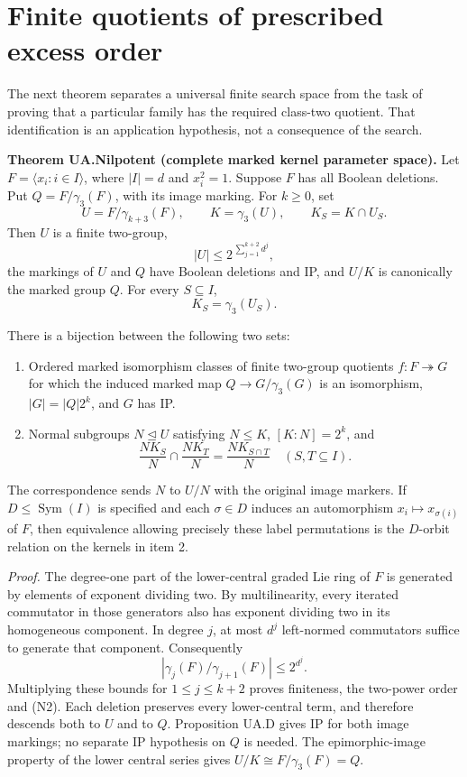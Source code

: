 \section{Finite quotients of prescribed excess order}\label{finite-quotients-of-prescribed-excess-order}

The next theorem separates a universal finite search space from the task
of proving that a particular family has the required class-two quotient.
That identification is an application hypothesis, not a consequence of
the search.

\textbf{Theorem UA.Nilpotent (complete marked kernel parameter space).}
Let \(F=\langle x_i:i\in I\rangle\), where \(|I|=d\) and \(x_i^2=1\).
Suppose \(F\) has all Boolean deletions. Put \(Q=F/\gamma_3(F)\), with
its image marking. For \(k\geq0\), set \[
U=F/\gamma_{k+3}(F),\qquad K=\gamma_3(U),\qquad
K_S=K\cap U_S.
\tag{N1}
\] Then \(U\) is a finite two-group, \[
|U|\leq 2^{\,\sum_{j=1}^{k+2}d^j},
\tag{N2}
\] the markings of \(U\) and \(Q\) have Boolean deletions and IP, and
\(U/K\) is canonically the marked group \(Q\). For every
\(S\subseteq I\), \[
K_S=\gamma_3(U_S).
\tag{N3}
\]

There is a bijection between the following two sets:

\begin{enumerate}
\def\labelenumi{\arabic{enumi}.}
\tightlist
\item
  Ordered marked isomorphism classes of finite two-group quotients
  \(f:F\twoheadrightarrow G\) for which the induced marked map
  \(Q\to G/\gamma_3(G)\) is an isomorphism, \(|G|=|Q|2^k\), and \(G\)
  has IP.
\item
  Normal subgroups \(N\unlhd U\) satisfying \(N\leq K\), \([K:N]=2^k\),
  and \[
  \frac{NK_S}{N}\cap\frac{NK_T}{N}
  =\frac{NK_{S\cap T}}{N}
  \quad(S,T\subseteq I).
  \tag{N4}
  \]
\end{enumerate}

The correspondence sends \(N\) to \(U/N\) with the original image
markers. If \(D\leq\operatorname{Sym}(I)\) is specified and each
\(\sigma\in D\) induces an automorphism \(x_i\mapsto x_{\sigma(i)}\) of
\(F\), then equivalence allowing precisely these label permutations is
the \(D\)-orbit relation on the kernels in item 2.

\emph{Proof.} The degree-one part of the lower-central graded Lie ring
of \(F\) is generated by elements of exponent dividing two. By
multilinearity, every iterated commutator in those generators also has
exponent dividing two in its homogeneous component. In degree \(j\), at
most \(d^j\) left-normed commutators suffice to generate that component.
Consequently \[
|\gamma_j(F)/\gamma_{j+1}(F)|\leq2^{d^j}.
\] Multiplying these bounds for \(1\leq j\leq k+2\) proves finiteness,
the two-power order and (N2). Each deletion preserves every
lower-central term, and therefore descends both to \(U\) and to \(Q\).
Proposition UA.D gives IP for both image markings; no separate IP
hypothesis on \(Q\) is needed. The epimorphic-image property of the
lower central series gives \(U/K\cong F/\gamma_3(F)=Q\).

